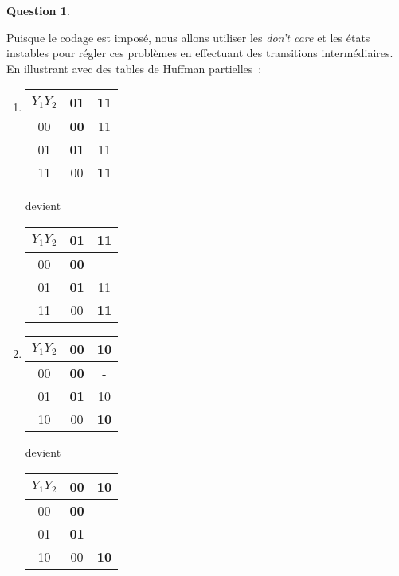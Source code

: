 \documentclass[11pt,a4paper,dvipsnames,]{article}
\theoremstyle{definition}%
\newtheorem{Q}{Question}[] %
\begin{document}
\begin{Q}
\begin{enumerate}
{			Puisque le codage est imposé, nous allons utiliser les \textit{don't care} et les états instables pour régler ces problèmes en effectuant des transitions intermédiaires.
			En illustrant avec des tables de Huffman partielles~:
			\begin{enumerate}
				\item 
					\begin{tabular}{|c|c|c|}\hline
					$Y_1Y_2$ & 01 & 11 \\ \hline
					00 & \textbf{00} & 11 \\ \hline
					01 & \textbf{01} & 11 \\ \hline
					11 & 00 & \textbf{11} \\ \hline
					\end{tabular}
					devient
					\begin{tabular}{|c|c|c|}\hline
					$Y_1Y_2$ & 01 & 11 \\ \hline
					00 & \textbf{00} & \color{red}{01} \\ \hline
					01 & \textbf{01} & 11 \\ \hline
					11 & 00 & \textbf{11} \\ \hline
					\end{tabular}

				\item
				\begin{tabular}{|c|c|c|}\hline
					$Y_1Y_2$ & 00 & 10 \\ \hline
					00 & \textbf{00} & - \\ \hline
					01 & \textbf{01} & 10 \\ \hline
					10 & 00 & \textbf{10} \\ \hline
				\end{tabular}
				devient
				\begin{tabular}{|c|c|c|}\hline
					$Y_1Y_2$ & 00 & 10 \\ \hline
					00 & \textbf{00} & \color{red}{10} \\ \hline
					01 & \textbf{01} & \color{red}{00} \\ \hline
					10 & 00 & \textbf{10} \\ \hline
				\end{tabular}


\end{enumerate}}
\end{enumerate}
\end{Q}
\end{document}
